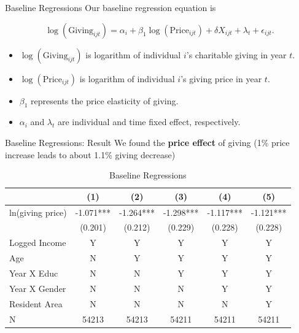 \documentclass[
  ignorenonframetext,
]{beamer}
\providecommand{\tightlist}{%
  \setlength{\itemsep}{0pt}\setlength{\parskip}{0pt}}
\begin{document}
\begin{frame}{Baseline Regressions}
\protect\hypertarget{baseline-regressions}{}
Our baseline regression equation is

\[
    \log(\text{Giving}_{ijt}) = 
    \alpha_i + \beta_1 \log(\text{Price}_{ijt}) + \delta X_{ijt} + \lambda_t + \epsilon_{ijt}.
\]

\begin{itemize}
\tightlist
\item
  \(\log(\text{Giving}_{ijt})\) is logarithm of individual \(i\)'s charitable giving in year \(t\).
\item
  \(\log(\text{Price}_{ijt})\) is logarithm of individual \(i\)'s giving price in year \(t\).
\item
  \(\beta_1\) represents the price elasticity of giving.
\item
  \(\alpha_i\) and \(\lambda_t\) are individual and time fixed effect, respectively.
\end{itemize}
\end{frame}

\begin{frame}{Baseline Regressions: Result}
\protect\hypertarget{baseline-regressions-result}{}
We found the \textbf{price effect} of giving (1\% price increase leads to about 1.1\% giving decrease)

\begin{table}

\caption{\label{tab:kableEstimateElasticity}Baseline Regressions}
\centering
\fontsize{9}{11}\selectfont
\begin{tabular}[t]{lccccc}
\toprule
 & (1) & (2) & (3) & (4) & (5)\\
\midrule
ln(giving price) & -1.071*** & -1.264*** & -1.298*** & -1.117*** & -1.121***\\
 & (0.201) & (0.212) & (0.229) & (0.228) & (0.228)\\
Logged Income & Y & Y & Y & Y & Y\\
Age & N & Y & Y & Y & Y\\
Year X Educ & N & N & Y & Y & Y\\
Year X Gender & N & N & N & Y & Y\\
Resident Area & N & N & N & N & Y\\
N & 54213 & 54213 & 54211 & 54211 & 54211\\
\bottomrule
\end{tabular}
\end{table}
\end{frame}
\end{document}
